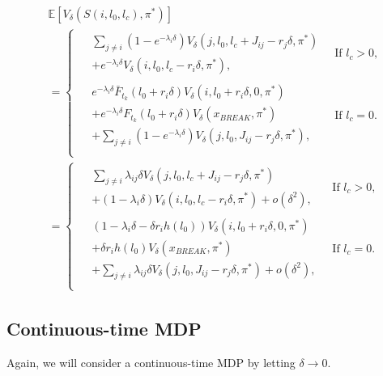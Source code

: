 \documentclass[a4paper]{thesis}
\theoremstyle{definition}
\begin{document}
\begin{equation}\label{eq:MmfmNextState}
\begin{split}
&\mathbb{E}[V_\delta(S(i,l_0,l_c),\pi^*)]\\
&=\begin{cases}
\begin{split}
&\sum\limits_{j\neq i}(1-e^{-\lambda_i \delta})V_\delta(j,l_0,l_c+J_{ij}-r_j\delta,\pi^*)\\
&+e^{-\lambda_i \delta}V_\delta(i,l_0,l_c-r_i\delta,\pi^*),
\end{split}&\ \text{If $l_c>0$,}\\
\begin{split}
&e^{-\lambda_i \delta} \bar{F}_{t_k}(l_0+r_i\delta)V_\delta(i,l_0+r_i\delta,0,\pi^*)\\
&+ e^{-\lambda_i \delta}F_{t_k}(l_0+r_i\delta)V_\delta(x_{BREAK},\pi^*)\\
&+\sum\limits_{j\neq i}(1-e^{-\lambda_i \delta})V_\delta(j,l_0,J_{ij}-r_j\delta,\pi^*),
\end{split}&\ \text{If $l_c=0$.}\\
\end{cases}\\
&=\begin{cases}
\begin{split}
&\sum\limits_{j\neq i}\lambda_{ij}\delta V_\delta(j,l_0,l_c+J_{ij}-r_j\delta,\pi^*)\\
&+(1-\lambda_i \delta)V_\delta(i,l_0,l_c-r_i\delta,\pi^*)+o(\delta^2),
\end{split}
&\ \text{If $l_c>0$,}\\
\begin{split}
&(1-\lambda_i \delta-\delta r_ih(l_0))V_\delta(i,l_0+r_i\delta,0,\pi^*)\\
&+ \delta r_ih(l_0)V_\delta(x_{BREAK},\pi^*)\\
&+\sum\limits_{j\neq i}\lambda_{ij} \delta V_\delta(j,l_0,J_{ij}-r_j\delta,\pi^*)+o(\delta^2),
\end{split}&\ \text{If $l_c=0$.}\\
\end{cases}
\end{split}
\end{equation}

\subsection{Continuous-time MDP}
Again, we will consider a continuous-time MDP by letting $\delta\rightarrow0$.
\end{document}
